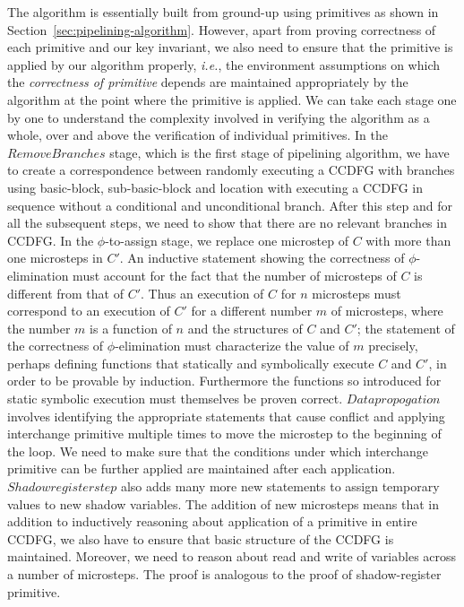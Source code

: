 The algorithm is essentially built from ground-up using primitives
as shown in Section~\ref{sec:pipelining-algorithm}. However, 
apart from proving correctness of each primitive and our key 
invariant, we also need to ensure that the primitive is applied by 
our algorithm properly, {\em i.e.}, the environment
assumptions on which the {\em correctness of primitive}
depends are maintained appropriately by the algorithm at
the point where the primitive is applied. We can take each stage one by one to understand the complexity involved in 
verifying the algorithm as a whole, over and above the verification of 
individual primitives. In the $Remove Branches$ stage, which is the first stage of pipelining algorithm, 
we have to create a correspondence between randomly executing a CCDFG with branches using basic-block, 
sub-basic-block and location with executing a CCDFG in sequence without a conditional and unconditional branch. 
After this step and for all the subsequent steps, we need to show that there are no relevant branches in CCDFG. 
In the $\phi$-to-assign stage, we replace one microstep of $C$ with more than one microsteps in $C'$. 
An inductive statement showing the correctness of $\phi$-elimination must account for the fact
that the number of microsteps of $C$ is different from that
of $C'$.  Thus an execution of $C$ for $n$ microsteps must
correspond to an execution of $C'$ for a different number
$m$ of microsteps, where the number $m$ is a function of $n$
and the structures of $C$ and $C'$; the statement of the
correctness of $\phi$-elimination must characterize the
value of $m$ precisely, perhaps defining functions that
statically and symbolically execute $C$ and $C'$, in order
to be provable by induction.  Furthermore the functions so
introduced for static symbolic execution must themselves be
proven correct. $Data propogation$ involves identifying 
the appropriate statements that cause conflict and applying 
interchange primitive multiple times 
to move the microstep to the beginning of the loop. 
We need to make sure that the conditions under which
interchange primitive can be further applied are maintained after each application. 
$Shadow register step$ also adds many more new statements to assign temporary values to 
new shadow variables. The addition of new microsteps means that in addition to 
inductively reasoning about application of a primitive in entire CCDFG, we also have to 
ensure that basic structure of the CCDFG is maintained. Moreover, we need to reason about read and write of 
variables across a number of microsteps. The proof is analogous to the proof of shadow-register primitive. 
